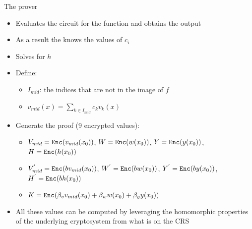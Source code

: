 \documentclass[handouts]{beamer}
\begin{document}
\begin{frame}{The prover}
\begin{itemize}
    \item Evaluates the circuit for the function and obtains the output \pause
    \item As a result the \prv knows the values of $c_i$ \pause
    \item Solves for $h$ \pause
    \item Define:
    \begin{itemize}
        \item $I_{mid}$: the indices that are not in the image of $f$ \pause
        \item $v_{mid}(x) = \sum_{k \in I_{mid}} c_k v_k(x)$ \pause
    \end{itemize}
    \item Generate the proof (9 encrypted values): \pause
    \begin{itemize}
        \item $V_{mid} = \mathtt{Enc}(v_{mid}(x_0))$, $W = \mathtt{Enc}(w(x_0))$,  
        $Y=\mathtt{Enc}(y(x_0))$, $H = \mathtt{Enc}(h(x_0))$ \pause
        \item $V_{mid}^{'} = \mathtt{Enc}(b v_{mid}(x_0))$, $W^{'} = \mathtt{Enc}(b w(x_0))$, $Y^{'}=\mathtt{Enc}(by(x_0))$, $H^{'} = \mathtt{Enc}(bh(x_0))$ \pause
        \item $K = \mathtt{Enc}(\beta_v v_{mid}(x_0) + \beta_w w(x_0)+\beta_y y(x_0)) $ \pause
    \end{itemize}
    \item All these values can be computed by leveraging the homomorphic properties of the underlying cryptosystem from what is on the CRS 
\end{itemize}
\end{frame}
\end{document}
